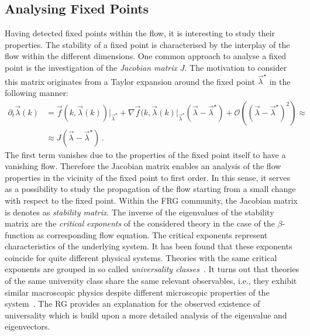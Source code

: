 \documentclass[paper=a4,11pt,bibliography=totoc]{scrartcl}
\begin{document}
\subsection{Analysing Fixed Points}
\label{sec:anaf}

Having detected fixed points within the flow, it is interesting to study their properties. The stability of a fixed point is characterised by the interplay of the flow within the different dimensions. One common approach to analyse a fixed point is the investigation of the \textit{Jacobian matrix} $J$. The motivation to consider this matrix originates from a Taylor expansion around the fixed point $\vec{\lambda}^\star$ in the following manner:
%
\begin{align}
\partial_t \vec{\lambda}(k) &= \vec{f}(k, \vec{\lambda}(k))\bigg|_{\vec{\lambda}^\star} + \nabla\vec{f}(k, \vec{\lambda}(k)\bigg|_{\vec{\lambda}^\star} \left(\vec{\lambda} - \vec{\lambda}^\star\right) + \mathcal{O}\left(\left(\vec{\lambda} - \vec{\lambda}^\star\right)^2\right)\approx\nonumber\\ &\approx J \left(\vec{\lambda} - \vec{\lambda}^\star\right)\,.
\end{align}
%
The first term vanishes due to the properties of the fixed point itself to have a vanishing flow. Therefore the Jacobian matrix enables an analysis of the flow properties in the vicinity of the fixed point to first order. In this sense, it serves as a possibility to study the propagation of the flow  starting from a small change with respect to the fixed point. Within the FRG community, the Jacobian matrix is denotes as \textit{stability matrix}. The inverse of the eigenvalues of the stability matrix are the \textit{critical exponents} of the considered theory in the case of the $\beta$-function as corresponding flow equation. The critical exponents represent characteristics of the underlying system. It has been found that these exponents coincide for quite different physical systems. Theories with the same critical exponents are grouped in so called \textit{universality classes}~\cite{Wilson1974}. It turns out that theories of the same university class share the same relevant observables, i.e., they exhibit similar macroscopic physics despite different microscopic properties of the system~\cite{Scherer2018, Pawlowski2018}. The RG provides an explanation for the observed existence of universality which is build upon a more detailed analysis of the eigenvalue and eigenvectors.
\end{document}
